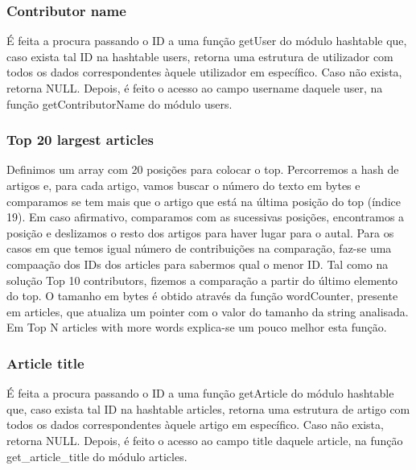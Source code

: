 \documentclass[a4paper]{article}
\begin{document}
\subsubsection{Contributor name}
É feita a procura passando o ID a uma função getUser do módulo hashtable que, caso exista tal ID na hashtable users, retorna uma estrutura de utilizador com todos os dados correspondentes àquele utilizador em específico. Caso não exista, retorna NULL. Depois, é feito o acesso ao campo username daquele user, na função getContributorName do módulo users.

\subsubsection{Top 20 largest articles}
Definimos um array com 20 posições para colocar o top. Percorremos a hash de artigos e, para cada artigo, vamos buscar o número do texto em bytes e comparamos se tem mais que o artigo que está na última posição do top (índice 19). Em caso afirmativo, comparamos com as sucessivas posições, encontramos a posição e deslizamos o resto dos artigos para haver lugar para o autal. Para os casos em que temos igual número de contribuições na comparação, faz-se uma compaação dos IDs dos articles para sabermos qual o menor ID.
Tal como na solução Top 10 contributors, fizemos a comparação a partir do último elemento do top.
O tamanho em bytes é obtido através da função wordCounter, presente em articles, que atualiza um pointer com o valor do tamanho da string analisada. Em Top N articles with more words explica-se um pouco melhor esta função.

\subsubsection{Article title}
É feita a procura passando o ID a uma função getArticle do módulo hashtable que, caso exista tal ID na hashtable articles, retorna uma estrutura de artigo com todos os dados correspondentes àquele artigo em específico. Caso não exista, retorna NULL. Depois, é feito o acesso ao campo title daquele article, na função get_article_title do módulo articles.
\end{document}

